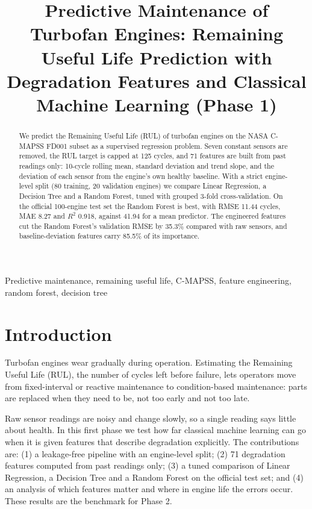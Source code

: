 \documentclass[conference]{IEEEtran}
\begin{document}
\title{Predictive Maintenance of Turbofan Engines: Remaining Useful Life Prediction with Degradation Features and Classical Machine Learning (Phase 1)}
\author{
}

\maketitle
\begin{abstract}
We predict the Remaining Useful Life (RUL) of turbofan engines on the NASA C-MAPSS FD001 subset as a supervised regression problem. Seven constant sensors are removed, the RUL target is capped at 125 cycles, and 71 features are built from past readings only: 10-cycle rolling mean, standard deviation and trend slope, and the deviation of each sensor from the engine's own healthy baseline. With a strict engine-level split (80 training, 20 validation engines) we compare Linear Regression, a Decision Tree and a Random Forest, tuned with grouped 3-fold cross-validation. On the official 100-engine test set the Random Forest is best, with RMSE 11.44 cycles, MAE 8.27 and $R^2$ 0.918, against 41.94 for a mean predictor. The engineered features cut the Random Forest's validation RMSE by 35.3\% compared with raw sensors, and baseline-deviation features carry 85.5\% of its importance.
\end{abstract}

\begin{IEEEkeywords}
Predictive maintenance, remaining useful life, C-MAPSS, feature engineering, random forest, decision tree
\end{IEEEkeywords}

\section{Introduction}
Turbofan engines wear gradually during operation. Estimating the Remaining Useful Life (RUL), the number of cycles left before failure, lets operators move from fixed-interval or reactive maintenance to condition-based maintenance: parts are replaced when they need to be, not too early and not too late.

Raw sensor readings are noisy and change slowly, so a single reading says little about health. In this first phase we test how far classical machine learning can go when it is given features that describe degradation explicitly. The contributions are: (1) a leakage-free pipeline with an engine-level split; (2) 71 degradation features computed from past readings only; (3) a tuned comparison of Linear Regression, a Decision Tree and a Random Forest on the official test set; and (4) an analysis of which features matter and where in engine life the errors occur. These results are the benchmark for Phase 2.
\end{document}
